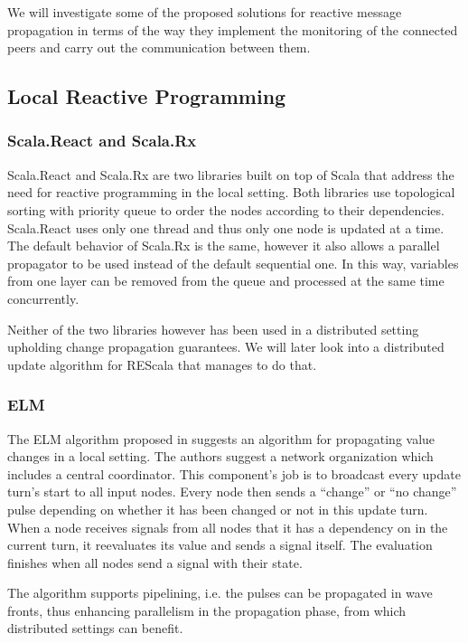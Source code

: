 \documentclass{sigplanconf}
\begin{document}
We will investigate some of the proposed solutions for reactive message propagation in terms of the way they implement the monitoring of the connected peers and carry out the communication between them.

\subsection{Local Reactive Programming}
\subsubsection{Scala.React and Scala.Rx}

Scala.React and Scala.Rx are two libraries built on top of Scala that address the need for reactive programming in the local setting. Both libraries use topological sorting with priority queue to order the nodes according to their dependencies. Scala.React uses only one thread and thus only one node is updated at a time. The default behavior of Scala.Rx is the same, however it also allows a parallel propagator to be used instead of the default sequential one. In this way, variables from one layer can be removed from the queue and processed at the same time concurrently. 

Neither of the two libraries however has been used in a distributed setting upholding change propagation guarantees. We will later look into a distributed update algorithm for REScala that manages to do that.

\subsubsection{ELM}
The ELM algorithm proposed in \cite{elm} suggests an algorithm for propagating value changes in a local setting. The authors suggest a network organization which includes a central coordinator. This component's job is to broadcast every update turn's start to all input nodes. Every node then sends a ``change'' or ``no change'' pulse depending on whether it has been changed or not in this update turn. When a node receives signals from all nodes that it has a dependency on in the current turn, it reevaluates its value and sends a signal itself. The evaluation finishes when all nodes send a signal with their state.

The algorithm supports pipelining, i.e. the pulses can be propagated in wave fronts, thus enhancing parallelism in the propagation phase, from which distributed settings can benefit.
\end{document}
